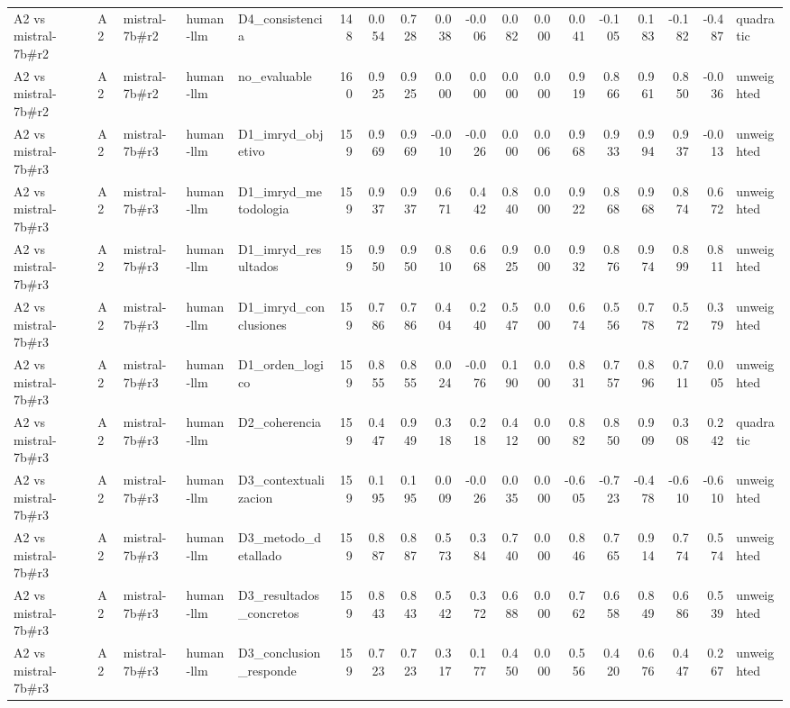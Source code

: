 \begin{table}
{\begin{tabular}{lllllrrrrrrrrrrrrl}
A2 vs mistral-7b\#r2 & A2 & mistral-7b\#r2 & human-llm & D4\_consistencia & 148 & 0.054 & 0.728 & 0.038 & -0.006 & 0.082 & 0.000 & 0.041 & -0.105 & 0.183 & -0.182 & -0.487 & quadratic \\
A2 vs mistral-7b\#r2 & A2 & mistral-7b\#r2 & human-llm & no\_evaluable & 160 & 0.925 & 0.925 & 0.000 & 0.000 & 0.000 & 0.000 & 0.919 & 0.866 & 0.961 & 0.850 & -0.036 & unweighted \\
A2 vs mistral-7b\#r3 & A2 & mistral-7b\#r3 & human-llm & D1\_imryd\_objetivo & 159 & 0.969 & 0.969 & -0.010 & -0.026 & 0.000 & 0.006 & 0.968 & 0.933 & 0.994 & 0.937 & -0.013 & unweighted \\
A2 vs mistral-7b\#r3 & A2 & mistral-7b\#r3 & human-llm & D1\_imryd\_metodologia & 159 & 0.937 & 0.937 & 0.671 & 0.442 & 0.840 & 0.000 & 0.922 & 0.868 & 0.968 & 0.874 & 0.672 & unweighted \\
A2 vs mistral-7b\#r3 & A2 & mistral-7b\#r3 & human-llm & D1\_imryd\_resultados & 159 & 0.950 & 0.950 & 0.810 & 0.668 & 0.925 & 0.000 & 0.932 & 0.876 & 0.974 & 0.899 & 0.811 & unweighted \\
A2 vs mistral-7b\#r3 & A2 & mistral-7b\#r3 & human-llm & D1\_imryd\_conclusiones & 159 & 0.786 & 0.786 & 0.404 & 0.240 & 0.547 & 0.000 & 0.674 & 0.556 & 0.778 & 0.572 & 0.379 & unweighted \\
A2 vs mistral-7b\#r3 & A2 & mistral-7b\#r3 & human-llm & D1\_orden\_logico & 159 & 0.855 & 0.855 & 0.024 & -0.076 & 0.190 & 0.000 & 0.831 & 0.757 & 0.896 & 0.711 & 0.005 & unweighted \\
A2 vs mistral-7b\#r3 & A2 & mistral-7b\#r3 & human-llm & D2\_coherencia & 159 & 0.447 & 0.949 & 0.318 & 0.218 & 0.412 & 0.000 & 0.882 & 0.850 & 0.909 & 0.308 & 0.242 & quadratic \\
A2 vs mistral-7b\#r3 & A2 & mistral-7b\#r3 & human-llm & D3\_contextualizacion & 159 & 0.195 & 0.195 & 0.009 & -0.026 & 0.035 & 0.000 & -0.605 & -0.723 & -0.478 & -0.610 & -0.610 & unweighted \\
A2 vs mistral-7b\#r3 & A2 & mistral-7b\#r3 & human-llm & D3\_metodo\_detallado & 159 & 0.887 & 0.887 & 0.573 & 0.384 & 0.740 & 0.000 & 0.846 & 0.765 & 0.914 & 0.774 & 0.574 & unweighted \\
A2 vs mistral-7b\#r3 & A2 & mistral-7b\#r3 & human-llm & D3\_resultados\_concretos & 159 & 0.843 & 0.843 & 0.542 & 0.372 & 0.688 & 0.000 & 0.762 & 0.658 & 0.849 & 0.686 & 0.539 & unweighted \\
A2 vs mistral-7b\#r3 & A2 & mistral-7b\#r3 & human-llm & D3\_conclusion\_responde & 159 & 0.723 & 0.723 & 0.317 & 0.177 & 0.450 & 0.000 & 0.556 & 0.420 & 0.676 & 0.447 & 0.267 & unweighted \\

\end{tabular}}
\end{table}
